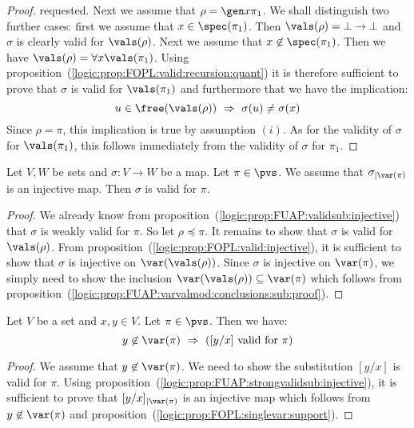 \begin{proof}
requested. Next we assume that $\rho=\gen x\pi_{1}$. We shall
distinguish two further cases: first we assume that
$x\in\spec(\pi_{1})$. Then $\vals(\rho)=\bot\to\bot$ and $\sigma$ is
clearly valid for $\vals(\rho)$. Next we assume that
$x\not\in\spec(\pi_{1})$. Then we have $\vals(\rho)=\forall
x\vals(\pi_{1})$. Using
proposition~(\ref{logic:prop:FOPL:valid:recursion:quant}) it is
therefore sufficient to prove that $\sigma$ is valid for
$\vals(\pi_{1})$ and furthermore that we have the implication:
    \[
    u\in\free(\vals(\rho))\ \Rightarrow\ \sigma(u)\neq\sigma(x)
    \]
Since $\rho=\pi$, this implication is true by assumption $(i)$. As
for the validity of $\sigma$ for $\vals(\pi_{1})$, this follows
immediately from the validity of $\sigma$ for $\pi_{1}$.
\end{proof}


\begin{prop}\label{logic:prop:FUAP:strongvalidsub:injective}
Let $V, W$ be sets and $\sigma:V\to W$ be a map. Let $\pi\in\pvs$.
We assume that $\sigma_{|\var(\pi)}$ is an injective map. Then
$\sigma$ is valid for $\pi$.
\end{prop}
\begin{proof}
We already know from
proposition~(\ref{logic:prop:FUAP:validsub:injective}) that $\sigma$
is weakly valid for $\pi$. So let $\rho\preceq\pi$. It remains to
show that $\sigma$ is valid for $\vals(\rho)$. From
proposition~(\ref{logic:prop:FOPL:valid:injective}), it is
sufficient to show that $\sigma$ is injective on
$\var(\vals(\rho))$. Since $\sigma$ is injective on $\var(\pi)$, we
simply need to show the inclusion
$\var(\vals(\rho))\subseteq\var(\pi)$ which follows from
proposition~(\ref{logic:prop:FUAP:varvalmod:conclusions:sub:proof}).
\end{proof}

\begin{prop}\label{logic:prop:FUAP:strongvalidsub:singlevar}
Let $V$ be a set and $x,y\in V$. Let $\pi\in\pvs$. Then we have:
    \[
    y\not\in\var(\pi)\ \Rightarrow\ (\mbox{$[y/x]$ valid for
    $\pi$})
    \]
\end{prop}
\begin{proof}
We assume that $y\not\in\var(\pi)$. We need to show the substitution
$[y/x]$ is valid for $\pi$. Using
proposition~(\ref{logic:prop:FUAP:strongvalidsub:injective}), it is
sufficient to prove that $[y/x]_{|\var(\pi)}$ is an injective map
which follows from $y\not\in\var(\pi)$ and
proposition~(\ref{logic:prop:FOPL:singlevar:support}).
\end{proof}

